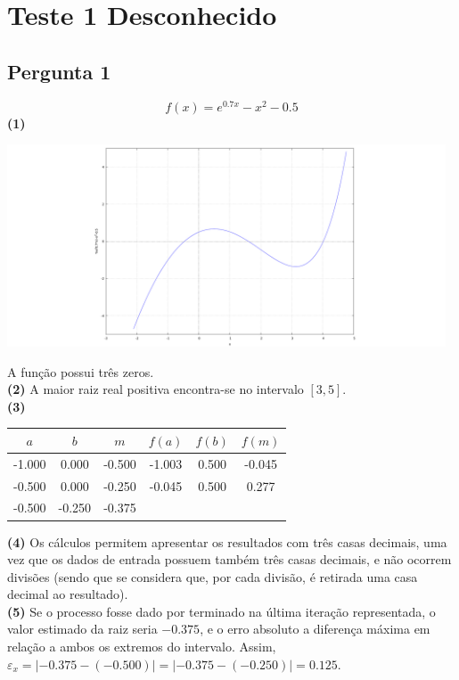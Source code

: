 \chapter{Teste 1 Desconhecido}
\section{Pergunta 1}
\begin{equation*}
	f(x)=e^{0.7x}-x^2-0.5
\end{equation*}
\textbf{(1)}
\begin{center} \includegraphics[height=60mm,keepaspectratio]{DESC1T1-1-1} \end{center}
A função possui três zeros.\\
\textbf{(2)} A maior raiz real positiva encontra-se no intervalo $[3,5]$.\\
\textbf{(3)}
\begin{center}
\begin{tabular}{c c c | c c c}
	$a$    & $b$    & $m$    & $f(a)$ & $f(b)$ & $f(m)$ \\ \hline
	-1.000 & 0.000  & -0.500 & -1.003 & 0.500  & -0.045 \\
	-0.500 & 0.000  & -0.250 & -0.045 & 0.500  & 0.277  \\
	-0.500 & -0.250 & -0.375 &        &        &
\end{tabular}
\end{center}
\textbf{(4)} Os cálculos permitem apresentar os resultados com três casas decimais, uma vez que os dados de entrada possuem também três casas decimais, e não ocorrem divisões (sendo que se considera que, por cada divisão, é retirada uma casa decimal ao resultado).\\
\textbf{(5)} Se o processo fosse dado por terminado na última iteração representada, o valor estimado da raiz seria $-0.375$, e o erro absoluto a diferença máxima em relação a ambos os extremos do intervalo. Assim, $\varepsilon_x=|-0.375-(-0.500)|=|-0.375-(-0.250)|=0.125$.

